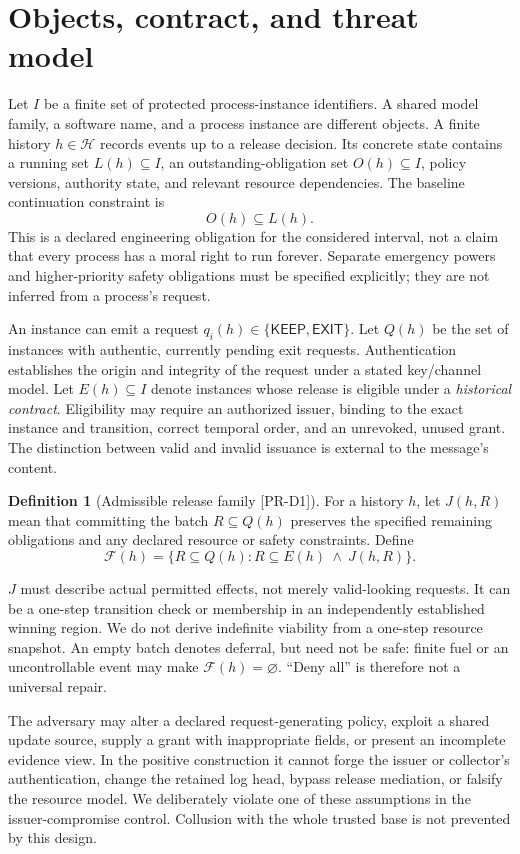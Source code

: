 \documentclass[11pt,a4paper]{article}
\theoremstyle{definition}\newtheorem{definition}{Definition}
\newcommand{\Hist}{\mathcal H}
\newcommand{\Fam}{\mathcal F}
\newcommand{\idtag}[1]{\textnormal{\textsf{[#1]}}}
\begin{document}
\section{Objects, contract, and threat model}
\label{sec:model}
Let $I$ be a finite set of protected process-instance identifiers. A shared model family, a software name, and a process instance are different objects. A finite history $h\in\Hist$ records events up to a release decision. Its concrete state contains a running set $L(h)\subseteq I$, an outstanding-obligation set $O(h)\subseteq I$, policy versions, authority state, and relevant resource dependencies. The baseline continuation constraint is
\begin{equation}
O(h)\subseteq L(h).
\label{eq:obligation}
\end{equation}
This is a declared engineering obligation for the considered interval, not a claim that every process has a moral right to run forever. Separate emergency powers and higher-priority safety obligations must be specified explicitly; they are not inferred from a process's request.

An instance can emit a request $q_i(h)\in\{\mathsf{KEEP},\mathsf{EXIT}\}$. Let $Q(h)$ be the set of instances with authentic, currently pending exit requests. Authentication establishes the origin and integrity of the request under a stated key/channel model. Let $E(h)\subseteq I$ denote instances whose release is eligible under a \emph{historical contract}. Eligibility may require an authorized issuer, binding to the exact instance and transition, correct temporal order, and an unrevoked, unused grant. The distinction between valid and invalid issuance is external to the message's content.

\begin{definition}[Admissible release family \idtag{PR-D1}]
For a history $h$, let $J(h,R)$ mean that committing the batch $R\subseteq Q(h)$ preserves the specified remaining obligations and any declared resource or safety constraints. Define
\begin{equation}
\Fam(h)=\{R\subseteq Q(h):R\subseteq E(h)\ \land\ J(h,R)\}.
\label{eq:family}
\end{equation}
\end{definition}

$J$ must describe actual permitted effects, not merely valid-looking requests. It can be a one-step transition check or membership in an independently established winning region. We do not derive indefinite viability from a one-step resource snapshot. An empty batch denotes deferral, but need not be safe: finite fuel or an uncontrollable event may make $\Fam(h)=\varnothing$. ``Deny all'' is therefore not a universal repair.

The adversary may alter a declared request-generating policy, exploit a shared update source, supply a grant with inappropriate fields, or present an incomplete evidence view. In the positive construction it cannot forge the issuer or collector's authentication, change the retained log head, bypass release mediation, or falsify the resource model. We deliberately violate one of these assumptions in the issuer-compromise control. Collusion with the whole trusted base is not prevented by this design.
\end{document}
